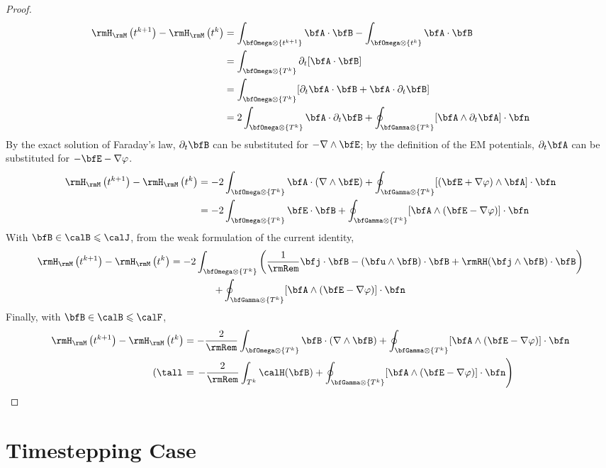         \begin{proof}
            \begin{align}
                \rmH_{\rmM}\left(t^{k + 1}\right) - \rmH_{\rmM}\left(t^{k}\right)  &=  \int_{\bfOmega\otimes\left\{t^{k + 1}\right\}}\bfA\cdot\bfB - \int_{\bfOmega\otimes\left\{t^{k}\right\}}\bfA\cdot\bfB  \\
                &=  \int_{\bfOmega\otimes\left\{T^{k}\right\}}\partial_{t}[\bfA\cdot\bfB]  \\
                &=  \int_{\bfOmega\otimes\left\{T^{k}\right\}}[\partial_{t}\bfA\cdot\bfB + \bfA\cdot\partial_{t}\bfB]  \\
                &=  2\int_{\bfOmega\otimes\left\{T^{k}\right\}}\bfA\cdot\partial_{t}\bfB + \oint_{\bfGamma\otimes\left\{T^{k}\right\}}[\bfA\wedge\partial_{t}\bfA]\cdot\bfn
            \end{align}
            By the exact solution of Faraday's law, $\partial_{t}\bfB$ can be substituted for $- \nabla\wedge\bfE$; by the definition of the EM potentials, $\partial_{t}\bfA$ can be substituted for $- \bfE - \nabla\varphi$.
            \begin{align}
                \rmH_{\rmM}\left(t^{k + 1}\right) - \rmH_{\rmM}\left(t^{k}\right)  &=  - 2\int_{\bfOmega\otimes\left\{T^{k}\right\}}\bfA\cdot(\nabla\wedge\bfE) + \oint_{\bfGamma\otimes\left\{T^{k}\right\}}[(\bfE + \nabla\varphi)\wedge\bfA]\cdot\bfn  \\
                &=  - 2\int_{\bfOmega\otimes\left\{T^{k}\right\}}\bfE\cdot\bfB + \oint_{\bfGamma\otimes\left\{T^{k}\right\}}[\bfA\wedge(\bfE - \nabla\varphi)]\cdot\bfn
            \end{align}
            With $\bfB  \in  \calB  \leqslant  \calJ$, from the weak formulation of the current identity,
            \begin{multline}
                \rmH_{\rmM}\left(t^{k + 1}\right) - \rmH_{\rmM}\left(t^{k}\right)  =  - 2\int_{\bfOmega\otimes\left\{T^{k}\right\}}\left(\frac{1}{\rmRem}\bfj\cdot\bfB - (\bfu\wedge\bfB)\cdot\bfB + \rmRH(\bfj\wedge\bfB)\cdot\bfB\right)  \\
                + \oint_{\bfGamma\otimes\left\{T^{k}\right\}}[\bfA\wedge(\bfE - \nabla\varphi)]\cdot\bfn
            \end{multline}
            Finally, with $\bfB  \in  \calB  \leqslant  \calF$,
            \begin{align}
                \rmH_{\rmM}\left(t^{k + 1}\right) - \rmH_{\rmM}\left(t^{k}\right)  &=  - \frac{2}{\rmRem}\int_{\bfOmega\otimes\left\{T^{k}\right\}}\bfB\cdot(\nabla\wedge\bfB) + \oint_{\bfGamma\otimes\left\{T^{k}\right\}}[\bfA\wedge(\bfE - \nabla\varphi)]\cdot\bfn  \\
                \left(\tall\right.&=  \left.- \frac{2}{\rmRem}\int_{T^{k}}\calH(\bfB) + \oint_{\bfGamma\otimes\left\{T^{k}\right\}}[\bfA\wedge(\bfE - \nabla\varphi)]\cdot\bfn\right)
            \end{align}
        \end{proof}

        
    \section*{Timestepping Case}
